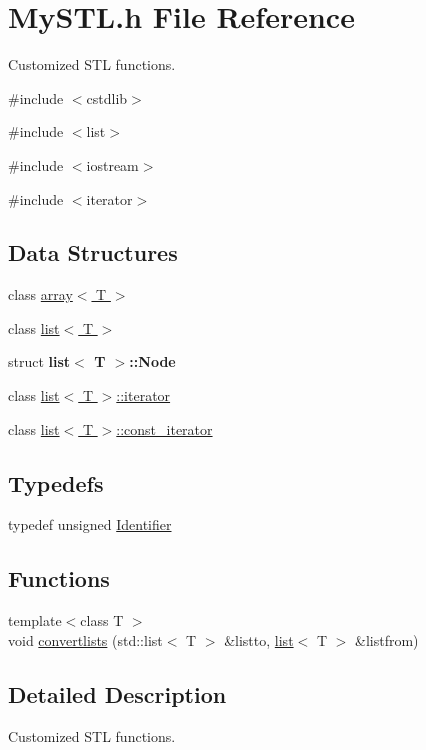 \section{MySTL.h File Reference}
\label{MySTL_8h}


Customized STL functions.  


{\ttfamily \#include $<$cstdlib$>$}\par
{\ttfamily \#include $<$list$>$}\par
{\ttfamily \#include $<$iostream$>$}\par
{\ttfamily \#include $<$iterator$>$}\par
\subsection*{Data Structures}
\begin{DoxyCompactItemize}
\item 
class \hyperlink{classarray}{array$<$ T $>$}
\item 
class \hyperlink{classlist}{list$<$ T $>$}
\item 
struct {\bfseries list$<$ T $>$::Node}
\item 
class \hyperlink{classlist_1_1iterator}{list$<$ T $>$::iterator}
\item 
class \hyperlink{classlist_1_1const__iterator}{list$<$ T $>$::const\_\-iterator}
\end{DoxyCompactItemize}
\subsection*{Typedefs}
\begin{DoxyCompactItemize}
\item 
typedef unsigned \hyperlink{MySTL_8h_a25e0b8ddd193bb84ebf6c0eeff6b1c82}{Identifier}
\end{DoxyCompactItemize}
\subsection*{Functions}
\begin{DoxyCompactItemize}
\item 
{\footnotesize template$<$class T $>$ }\\void \hyperlink{MySTL_8h_a18d844193db32a138abf249064eb94fe}{convertlists} (std::list$<$ T $>$ \&listto, \hyperlink{classlist}{list}$<$ T $>$ \&listfrom)
\end{DoxyCompactItemize}


\subsection{Detailed Description}
Customized STL functions. 

